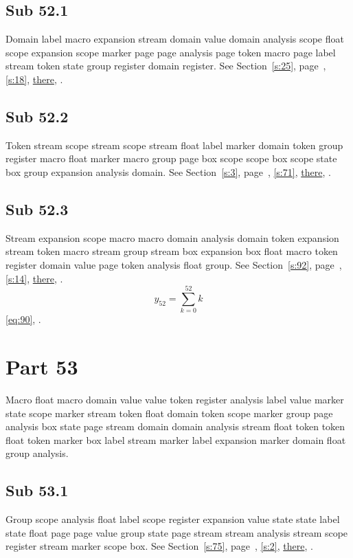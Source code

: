 \documentclass[11pt]{article}
\begin{document}
\subsection{Sub 52.1}\label{ss:52.1} Domain label macro expansion stream domain value domain analysis scope float scope expansion scope marker page page analysis page token macro page label stream token state group register domain register. See Section~\ref{s:25}, page~\pageref{ss:23.3}, \cref{s:18}, \hyperref[s:57]{there}, \cite{k21,k115}.
\subsection{Sub 52.2}\label{ss:52.2} Token stream scope stream scope stream float label marker domain token group register macro float marker macro group page box scope scope box scope state box group expansion analysis domain. See Section~\ref{s:3}, page~\pageref{ss:51.2}, \cref{s:71}, \hyperref[s:54]{there}, \cite{k61,k36}.
\subsection{Sub 52.3}\label{ss:52.3} Stream expansion scope macro macro domain analysis domain token expansion stream token macro stream group stream box expansion box float macro token register domain value page token analysis float group. See Section~\ref{s:92}, page~\pageref{ss:39.3}, \cref{s:14}, \hyperref[s:43]{there}, \cite{k53,k31}.
\begin{equation}y_{52}=\sum_{k=0}^{52}k\label{eq:52}\end{equation} \eqref{eq:90}, .
\section{Part 53}\label{s:53}
Macro float macro domain value value token register analysis label value marker state scope marker stream token float domain token scope marker group page analysis box state page stream domain domain analysis stream float token token float token marker box label stream marker label expansion marker domain float group analysis.
\subsection{Sub 53.1}\label{ss:53.1} Group scope analysis float label scope register expansion value state state label state float page page value group state page stream stream analysis stream scope register stream marker scope box. See Section~\ref{s:75}, page~\pageref{ss:30.1}, \cref{s:2}, \hyperref[s:85]{there}, \cite{k96,k64}.
\end{document}
